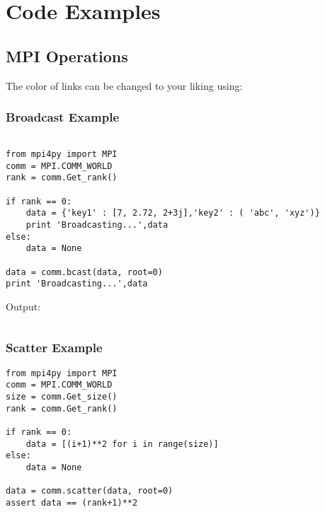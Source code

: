 
\chapter{Code Examples} %

\label{AppendixA} %

\section{MPI Operations}

The color of links can be changed to your liking using:
%
%
%
%
%
%
%
%

\subsection {Broadcast Example}
\label{appendix:broadcast}
\begin{verbatim}

from mpi4py import MPI
comm = MPI.COMM_WORLD
rank = comm.Get_rank()

if rank == 0:
	data = {'key1' : [7, 2.72, 2+3j],'key2' : ( 'abc', 'xyz')}
	print 'Broadcasting...',data
else:
	data = None
	
data = comm.bcast(data, root=0)
print 'Broadcasting...',data

\end{verbatim}

Output:

\begin{verbatim}

\end{verbatim}

\subsection {Scatter Example}
\label{appendix:scatter}
\begin{verbatim}
from mpi4py import MPI
comm = MPI.COMM_WORLD
size = comm.Get_size()
rank = comm.Get_rank()

if rank == 0:
	data = [(i+1)**2 for i in range(size)]
else:
	data = None

data = comm.scatter(data, root=0)
assert data == (rank+1)**2

\end{verbatim}


